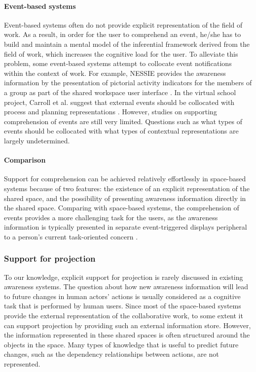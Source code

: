 \paragraph*{Event-based systems} %
\label{par:event_based_sytems}
Event-based systems often do not provide explicit representation of the field of work. As a result, in order for the user to comprehend an event, he/she has to build and maintain a mental model of the inferential framework derived from the field of work, which increases the cognitive load for the user. To alleviate this problem, some event-based systems attempt to collocate event notifications within the context of work. For example, NESSIE provides the awareness information by the presentation of pictorial activity indicators for the members of a group as part of the shared workspace user interface \cite{prinz1999a}. In the virtual school project, Carroll et al. suggest that external events should be collocated with process and planning representations \cite{carroll2003a}. However, studies on supporting comprehension of events are still very limited. Questions such as what types of events should be collocated with what types of contextual representations are largely undetermined.

\paragraph*{Comparison} %
\label{par:comparison}
Support for comprehension can be achieved relatively effortlessly in space-based systems because of two features: the existence of an explicit representation of the shared space, and the possibility of presenting awareness information directly in the shared space. Comparing with space-based systems, the comprehension of events provides a more challenging task for the users, as the awareness information is typically presented in separate event-triggered displays peripheral to a person's current task-oriented concern \cite{carroll2003a}. 

\subsubsection{Support for projection} %
\label{ssub:support_for_projection}
To our knowledge, explicit support for projection is rarely discussed in existing awareness systems. The question about how new awareness information will lead to future changes in human actors' actions is usually considered as a cognitive task that is performed by human users. Since most of the space-based systems provide the external representation of the collaborative work, to some extent it can support projection by providing such an external information store. However, the information represented in these shared spaces is often structured around the objects in the space. Many types of knowledge that is useful to predict future changes, such as the dependency relationships between actions, are not represented.


